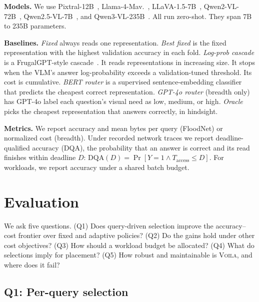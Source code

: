 \documentclass[10pt,conference]{IEEEtran}
\newcommand{\system}{\textsc{Voila}\xspace}
\newcommand{\mLlama}{Llama-4-Mav.\xspace}
\newcommand{\mLlava}{LLaVA-1.5-7B\xspace}
\newcommand{\mPix}{Pixtral-12B\xspace}
\newcommand{\mQThree}{Qwen3-VL-235B\xspace}
\newcommand{\mQSevTwo}{Qwen2-VL-72B\xspace}
\newcommand{\mQSev}{Qwen2.5-VL-7B\xspace}
\begin{document}
\textbf{Models.} We use \mPix~\cite{pixtral2024}, \mLlama~\cite{meta2025llama4},
\mLlava~\cite{liu2024improved}, \mQSevTwo~\cite{Qwen2VL},
\mQSev~\cite{bai2025qwen25vl}, and \mQThree~\cite{qwen3vl2025}. All run
zero-shot. They span 7B to 235B parameters.

\textbf{Baselines.} \emph{Fixed} always reads one representation. \emph{Best
fixed} is the fixed representation with the highest validation accuracy in
each fold. \emph{Log-prob cascade} is a FrugalGPT-style
cascade~\cite{chen2023frugalgpt}. It reads representations in increasing size.
It stops when the VLM's answer log-probability exceeds a validation-tuned
threshold. Its cost is cumulative. \emph{BERT router} is a supervised
sentence-embedding classifier that predicts the cheapest correct
representation. \emph{GPT-4o router} (breadth only) has GPT-4o label each
question's visual need as low, medium, or high. \emph{Oracle} picks the
cheapest representation that answers correctly, in hindsight.

\textbf{Metrics.} We report accuracy and mean bytes per query (FloodNet) or
normalized cost (breadth). Under recorded network traces we report
deadline-qualified accuracy (DQA), the probability that an answer is correct
and its read finishes within deadline $D$:
$\mathrm{DQA}(D)=\Pr[Y=1\wedge T_{\mathrm{access}}\le D]$. For workloads, we
report accuracy under a shared batch budget.



\section{Evaluation}
\label{sec:eval}

We ask five questions. (Q1) Does query-driven selection improve the
accuracy--cost frontier over fixed and adaptive policies? (Q2) Do the gains
hold under other cost objectives? (Q3) How should a workload budget be
allocated? (Q4) What do selections imply for placement? (Q5) How robust and
maintainable is \system, and where does it fail?

\subsection{Q1: Per-query selection}
\label{sec:q1}
\end{document}
